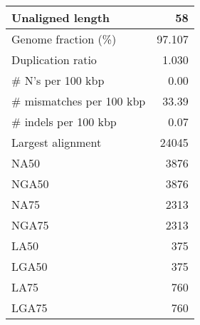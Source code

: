 \documentclass[12pt,a4paper]{article}
\begin{document}
\begin{table}[ht]
\begin{center}
\begin{tabular}{|l*{1}{|r}|}
Unaligned length & 58 \\ \hline
Genome fraction (\%) & 97.107 \\ \hline
Duplication ratio & 1.030 \\ \hline
\# N's per 100 kbp & 0.00 \\ \hline
\# mismatches per 100 kbp & 33.39 \\ \hline
\# indels per 100 kbp & 0.07 \\ \hline
Largest alignment & 24045 \\ \hline
NA50 & 3876 \\ \hline
NGA50 & 3876 \\ \hline
NA75 & 2313 \\ \hline
NGA75 & 2313 \\ \hline
LA50 & 375 \\ \hline
LGA50 & 375 \\ \hline
LA75 & 760 \\ \hline
LGA75 & 760 \\ \hline
\end{tabular}
\end{center}
\end{table}
\end{document}
